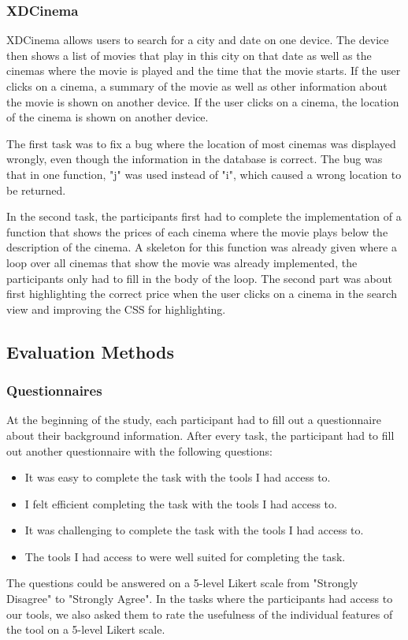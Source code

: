 \subsubsection{XDCinema}

XDCinema allows users to search for a city and date on one device. The device then shows a list of movies that play in this city on that date as well as the cinemas where the movie is played and the time that the movie starts. If the user clicks on a cinema, a summary of the movie as well as other information about the movie is shown on another device. If the user clicks on a cinema, the location of the cinema is shown on another device.

The first task was to fix a bug where the location of most cinemas was displayed wrongly, even though the information in the database is correct. The bug was that in one function, "j" was used instead of "i", which caused a wrong location to be returned.

In the second task, the participants first had to complete the implementation of a function that shows the prices of each cinema where the movie plays below the description of the cinema. A skeleton for this function was already given where a loop over all cinemas that show the movie was already implemented, the participants only had to fill in the body of the loop. The second part was about first highlighting the correct price when the user clicks on a cinema in the search view and improving the CSS for highlighting. 

\subsection{Evaluation Methods}

\subsubsection{Questionnaires}
At the beginning of the study, each participant had to fill out a questionnaire about their background information. After every task, the participant had to fill out another questionnaire with the following questions:
\begin{itemize}
	\item It was easy to complete the task with the tools I had access to.
	\item I felt efficient completing the task with the tools I had access to.
	\item It was challenging to complete the task with the tools I had access to.
	\item The tools I had access to were well suited for completing the task.
\end{itemize}
The questions could be answered on a 5-level Likert scale from "Strongly Disagree" to "Strongly Agree". In the tasks where the participants had access to our tools, we also asked them to rate the usefulness of the individual features of the tool on a 5-level Likert scale.


